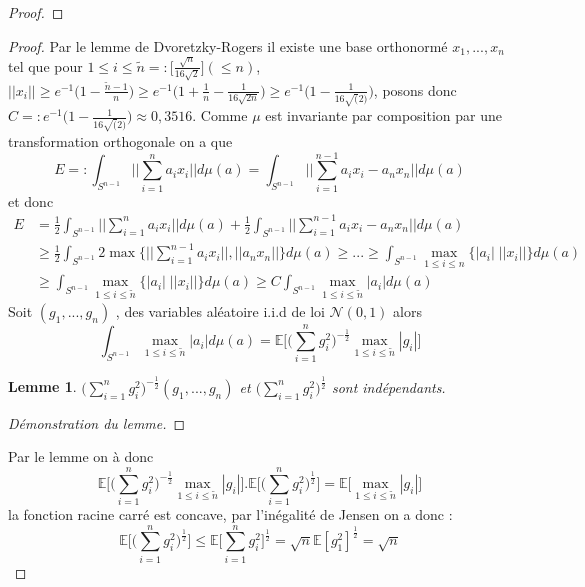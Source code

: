 \documentclass[12pt]{article}
\newtheorem{lemme}{Lemme}[section]
\newtheorem{proposition}{Proposition}[section]
\newcommand{\boxXx}[1]{\medskip\noindent\fbox{\begin{minipage}{\textwidth}\vspace{2pt}#1\vspace{2pt}\end{minipage}}\medskip}
\begin{document}
\begin{proof}
\end{proof}

\boxXx{
	\begin{proposition}[Estimation de $E$]\label{esE}
		Il existe $c>0$ tel que $E \geq c \sqrt{\frac{\log n}{n}}$.
	\end{proposition}
}
\begin{proof}
	Par le lemme de Dvoretzky-Rogers il existe une base orthonormé $x_1,...,x_n$ tel que pour $1\leq i \leq \tilde{n}=:\big[\frac{\sqrt{n}}{16\sqrt{2}}\big](\leq n)$, $||x_i||\geq e^{-1}\Big(1-\frac{\tilde{n} -1}{n}\Big)\geq e^{-1}\Big(1+\frac{1}{n}-\frac{1}{16\sqrt{2n}}\Big)\geq e^{-1}\big(1-\frac{1}{16\sqrt(2)}\big) $, posons donc $C=:e^{-1}\big(1-\frac{1}{16\sqrt(2)}\big)\approx0,3516$. Comme $\mu$ est invariante par composition par une transformation orthogonale on a que  
	\begin{equation*}
		E=:\int_{S^{n-1}} ||\sum_{i=1}^{n}a_ix_i||d\mu(a)= \int_{S^{n-1}} ||\sum_{i=1}^{n-1}a_ix_i-a_nx_n||d\mu(a)
	\end{equation*}
	et donc 
	\begin{align*}
		E&=\frac{1}{2}\int_{S^{n-1}} ||\sum_{i=1}^{n}a_ix_i||d\mu(a)+ \frac{1}{2}\int_{S^{n-1}} ||\sum_{i=1}^{n-1}a_ix_i-a_nx_n||d\mu(a)\\
		&\geq\frac{1}{2}\int_{S^{n-1}} 2\max\Big\{||\sum_{i=1}^{n-1}a_ix_i||,||a_nx_n||\Big\}d\mu(a)\geq ...\geq \int_{S^{n-1}} \max_{1\leq i \leq n}\Big\{|a_i|\;||x_i||\Big\}d\mu(a)\\
		&\geq \int_{S^{n-1}} \max_{1\leq i \leq \tilde{n}}\Big\{|a_i|\;||x_i||\Big\}d\mu(a) \geq C\int_{S^{n-1}} \max_{1\leq i \leq \tilde{n}}|a_i| d\mu(a)	
	\end{align*}
	Soit $(g_1,...,g_n)$ , des variables aléatoire i.i.d de loi $\mathcal{N}(0,1)$ alors 
	\begin{equation*}
		\int_{S^{n-1}} \max_{1\leq i \leq \tilde{n}}|a_i| d\mu(a) =\mathbb{E}\Big[\big(\sum_{i=1}^{n}g_i^2\big)^{-\frac{1}{2}} \max_{1\leq i \leq \tilde{n}}|g_i|\Big]
	\end{equation*}
	\begin{lemme}
		$\big(\sum_{i=1}^{n}g_i^2\big)^{-\frac{1}{2}}(g_1,...,g_n)$ et $\big(\sum_{i=1}^{n}g_i^2\big)^{\frac{1}{2}}$ sont indépendants.
	\end{lemme}
	\begin{proof}[\color{red}Démonstration du lemme]
	\end{proof}
	\color{black}
	Par le lemme on à donc 
	\begin{equation*}
		\mathbb{E}\Big[\big(\sum_{i=1}^{n}g_i^2\big)^{-\frac{1}{2}} \max_{1\leq i \leq \tilde{n}}|g_i|\Big] . \mathbb{E}\Big[\big(\sum_{i=1}^{n}g_i^2\big)^{\frac{1}{2}}\Big] = \mathbb{E}\big[\max_{1\leq i \leq \tilde{n}}|g_i|\big]
	\end{equation*}
	la fonction racine carré est concave, par l'inégalité de Jensen on a donc :
	\begin{equation*}
		\mathbb{E}\big[\big(\sum_{i=1}^{n}g_i^2\big)^{\frac{1}{2}}\big]\leq \mathbb{E}\big[\sum_{i=1}^{n}g_i^2\big]^{\frac{1}{2}}= \sqrt{n} \mathbb{E}[g_1^2]^{\frac{1}{2}}=\sqrt{n} 
	\end{equation*}


\end{proof}
\end{document}

